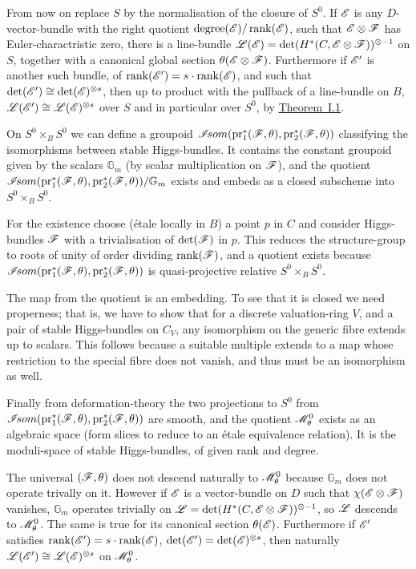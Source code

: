 \documentclass[12pt,english]{smfart}
\theoremstyle{plain} \newtheorem{innerthm}{Theorem} \newtheorem{innerlem}{Lemma} \newtheorem{innerprop}{Proposition} \newtheorem{innercor}{Corollary} \theoremstyle{definition} \newtheorem{innerdefn}{Definition} \newtheorem{innerconstr}{Construction} \theoremstyle{remark} \newtheorem*{remark}{Remark} \newtheorem*{remarks}{Remarks} \newtheorem*{applications}{Applications}
\newcommand{\refthm}[1]{\hyperref[thm:#1]{Theorem~#1}} \newcommand{\reflem}[1]{\hyperref[lem:#1]{Lemma~#1}} \newcommand{\refprop}[1]{\hyperref[prop:#1]{Proposition~#1}} \newcommand{\refcor}[1]{\hyperref[cor:#1]{Corollary~#1}} \newcommand{\refdef}[1]{\hyperref[def:#1]{Definition~#1}} \newcommand{\refconstr}[1]{\hyperref[constr:#1]{Construction~#1}} \newcommand{\refsec}[1]{\hyperref[sec:#1]{\S#1}}
\begin{document}
From now on replace $S$ by the normalisation of the closure of $S^0$. If $\mathscr{E}$ is any $D$-vector-bundle with the right quotient $\operatorname{degree}(\mathscr{E})/\operatorname{rank}(\mathscr{E})$, such that $\mathscr{E}\otimes\mathscr{F}$ has Euler-charactristic zero, there is a line-bundle $\mathscr{L}(\mathscr{E})=\det(H^*(C,\mathscr{E}\otimes\mathscr{F}))^{\otimes-1}$ on $S$, together with a canonical global section $\theta(\mathscr{E}\otimes\mathscr{F})$. Furthermore if $\mathscr{E}'$ is another such bundle, of $\operatorname{rank}(\mathscr{E}')=s\cdot\operatorname{rank}(\mathscr{E})$, and such that $\det(\mathscr{E}')\cong\det(\mathscr{E})^{\otimes s}$, then up to product with the pullback of a line-bundle on $B$, $\mathscr{L}(\mathscr{E}')\cong\mathscr{L}(\mathscr{E})^{\otimes s}$ over $S$ and in particular over $S^0$, by \refthm{I.1}.

On $S^0\times_B S^0$ we can define a groupoid $\mathscr{I}\!som(\mathrm{pr}_1^*(\mathscr{F},\theta),\mathrm{pr}_2^*(\mathscr{F},\theta))$ classifying the isomorphisms between stable Higgs-bundles. It contains the constant groupoid given by the scalars $\mathbb{G}_m$ (by scalar multiplication on $\mathscr{F}$), and the quotient $\mathscr{I}\!som(\mathrm{pr}_1^*(\mathscr{F},\theta),\mathrm{pr}_2^*(\mathscr{F},\theta))/\mathbb{G}_m$ exists and embeds as a closed subscheme into $S^0\times_B S^0$.

For the existence choose (\'etale locally in $B$) a point $p$ in $C$ and consider Higgs-bundles $\mathscr{F}$ with a trivialisation of $\det(\mathscr{F})$ in $p$. This reduces the structure-group to roots of unity of order dividing $\operatorname{rank}(\mathscr{F})$, and a quotient exists because $\mathscr{I}\!som(\mathrm{pr}_1^*(\mathscr{F},\theta),\mathrm{pr}_2^*(\mathscr{F},\theta))$ is quasi-projective relative $S^0\times_B S^0$.

The map from the quotient is an embedding. To see that it is closed we need properness; that is, we have to show that for a discrete valuation-ring $V$, and a pair of stable Higgs-bundles on $C_V$, any isomorphism on the generic fibre extends up to scalars. This follows because a suitable multiple extends to a map whose restriction to the special fibre does not vanish, and thus must be an isomorphism as well.

Finally from deformation-theory the two projections to $S^0$ from
$\mathscr{I}\!som(\mathrm{pr}_1^*(\mathscr{F},\theta),\mathrm{pr}_2^*(\mathscr{F},\theta))$ are smooth, and the quotient $\mathscr{M}_\theta^0$ exists as an algebraic space (form slices to reduce to an \'etale equivalence relation). It is the moduli-space of stable Higgs-bundles, of given rank and degree.

The universal $(\mathscr{F},\theta)$ does not descend naturally to $\mathscr{M}_\theta^0$ because $\mathbb{G}_m$ does not operate trivally on it. However if $\mathscr{E}$ is a vector-bundle on $D$ such that $\chi(\mathscr{E}\otimes\mathscr{F})$ vanishes, $\mathbb{G}_m$ operates trivially on $\mathscr{L}=\det(H^*(C,\mathscr{E}\otimes\mathscr{F}))^{\otimes-1}$, so $\mathscr{L}$ descends to $\mathscr{M}_\theta^0$. The same is true for its canonical section $\theta(\mathscr{E})$. Furthermore if $\mathscr{E}'$ satisfies $\operatorname{rank}(\mathscr{E}')=s\cdot\operatorname{rank}(\mathscr{E})$, $\det(\mathscr{E}')=\det(\mathscr{E})^{\otimes s}$, then naturally $\mathscr{L}(\mathscr{E}')\cong\mathscr{L}(\mathscr{E})^{\otimes s}$ on $\mathscr{M}_\theta^0$.
\end{document}
